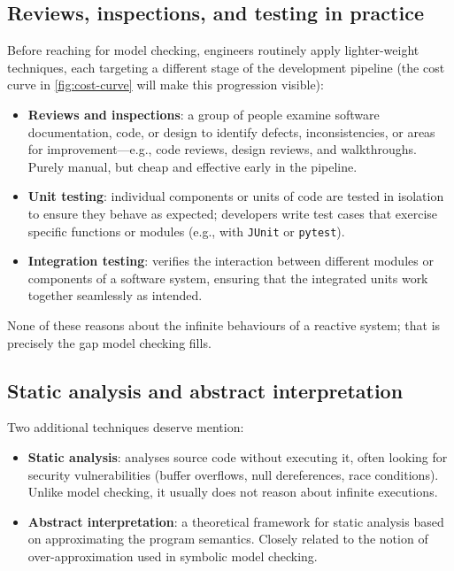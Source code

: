 \subsection{Reviews, inspections, and testing in practice}

Before reaching for model checking, engineers routinely apply lighter-weight
techniques, each targeting a different stage of the development pipeline
(the cost curve in \cref{fig:cost-curve} will make this progression visible):
\begin{itemize}
  \item \textbf{Reviews and inspections}: a group of people examine
        software documentation, code, or design to identify defects,
        inconsistencies, or areas for improvement---e.g., code reviews,
        design reviews, and walkthroughs.  Purely manual, but cheap and
        effective early in the pipeline.
  \item \textbf{Unit testing}: individual components or units of code are
        tested in isolation to ensure they behave as expected; developers
        write test cases that exercise specific functions or modules
        (e.g., with \texttt{JUnit} or \texttt{pytest}).
  \item \textbf{Integration testing}: verifies the interaction between
        different modules or components of a software system, ensuring
        that the integrated units work together seamlessly as intended.
\end{itemize}
None of these reasons about the infinite behaviours of a reactive system;
that is precisely the gap model checking fills.

\subsection{Static analysis and abstract interpretation}

Two additional techniques deserve mention:
\begin{itemize}
  \item \textbf{Static analysis}: analyses source code without executing it,
        often looking for security vulnerabilities (buffer overflows, null
        dereferences, race conditions).  Unlike model checking, it usually
        does not reason about infinite executions.
  \item \textbf{Abstract interpretation}: a theoretical framework for static
        analysis based on approximating the program semantics.  Closely
        related to the notion of over-approximation used in symbolic model
        checking.
\end{itemize}

